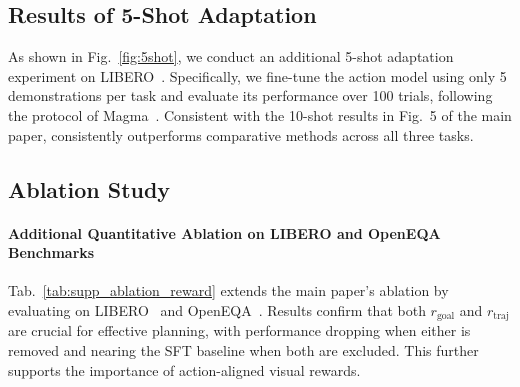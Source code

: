 \subsection{Results of 5-Shot Adaptation}
As shown in Fig.~\ref{fig:5shot}, we conduct an additional 5-shot adaptation experiment on LIBERO~\cite{liu2023libero}. Specifically, we fine-tune the action model using only 5 demonstrations per task and evaluate its performance over 100 trials, following the protocol of Magma~\cite{yang2025magma}. Consistent with the 10-shot results in Fig.~5 of the main paper, \ours{} consistently outperforms comparative methods across all three tasks.


\subsection{Ablation Study}\label{supp:ssec:ablation}
\paragraph{Additional Quantitative Ablation on LIBERO and OpenEQA Benchmarks}
Tab.~\ref{tab:supp_ablation_reward} extends the main paper's ablation by evaluating on LIBERO~\cite{liu2023libero} and OpenEQA~\cite{majumdar2023openeqa}. Results confirm that both $r_{\text{goal}}$ and $r_{\text{traj}}$ are crucial for effective planning, with performance dropping when either is removed and nearing the SFT baseline when both are excluded. This further supports the importance of action-aligned visual rewards.

